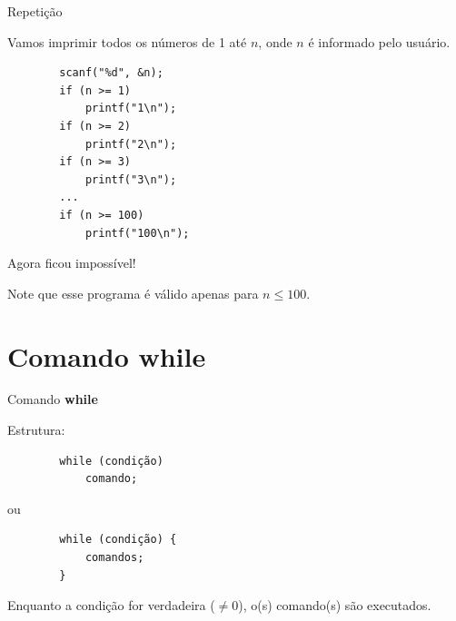 \documentclass[handout]{beamer}
\begin{document}
\begin{frame}[fragile]{Repetição}

    Vamos imprimir todos os números de 1 até $n$, onde $n$ é informado pelo usuário.

    \begin{verbatim}
        scanf("%d", &n);
        if (n >= 1)
            printf("1\n");
        if (n >= 2)
            printf("2\n");
        if (n >= 3)
            printf("3\n");
        ...
        if (n >= 100)
            printf("100\n");
    \end{verbatim}

    \pause
    Agora ficou impossível!

    Note que esse programa é válido apenas para $n \leq 100$.
\end{frame}


\section{Comando {\bf while}}%

\begin{frame}[fragile]{Comando {\bf while}}

    Estrutura:

    \begin{verbatim}
        while (condição)
            comando;
    \end{verbatim}

    ou

    \begin{verbatim}
        while (condição) {
            comandos;
        }
    \end{verbatim}

    Enquanto a condição for verdadeira ($\neq 0$), o(s) comando(s) são executados.
\end{frame}
\end{document}
